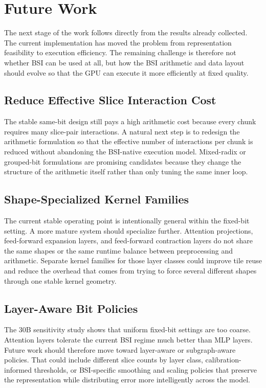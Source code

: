\chapter{Future Work}

The next stage of the work follows directly from the results already collected. The current implementation has moved the problem from representation feasibility to execution efficiency. The remaining challenge is therefore not whether BSI can be used at all, but how the BSI arithmetic and data layout should evolve so that the GPU can execute it more efficiently at fixed quality.

\section{Reduce Effective Slice Interaction Cost}
The stable same-bit design still pays a high arithmetic cost because every chunk requires many slice-pair interactions. A natural next step is to redesign the arithmetic formulation so that the effective number of interactions per chunk is reduced without abandoning the BSI-native execution model. Mixed-radix or grouped-bit formulations are promising candidates because they change the structure of the arithmetic itself rather than only tuning the same inner loop.

\section{Shape-Specialized Kernel Families}
The current stable operating point is intentionally general within the fixed-bit setting. A more mature system should specialize further. Attention projections, feed-forward expansion layers, and feed-forward contraction layers do not share the same shapes or the same runtime balance between preprocessing and arithmetic. Separate kernel families for those layer classes could improve tile reuse and reduce the overhead that comes from trying to force several different shapes through one stable kernel geometry.

\section{Layer-Aware Bit Policies}
The 30B sensitivity study shows that uniform fixed-bit settings are too coarse. Attention layers tolerate the current BSI regime much better than MLP layers. Future work should therefore move toward layer-aware or subgraph-aware policies. That could include different slice counts by layer class, calibration-informed thresholds, or BSI-specific smoothing and scaling policies that preserve the representation while distributing error more intelligently across the model.

